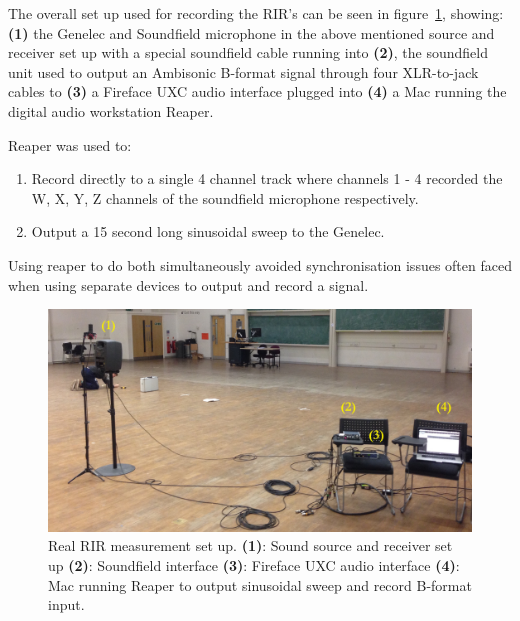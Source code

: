 \documentclass[../../main.tex]{subfiles}
\begin{document}
		The overall set up used for recording the \ac{RIR}'s can be seen in figure~\ref{realRIRSetup}, showing: \textbf{(1)} the Genelec and Soundfield microphone in the above mentioned source and receiver set up with a special soundfield cable running into \textbf{(2)}, the soundfield unit used to output an Ambisonic B-format signal through four XLR-to-jack cables to \textbf{(3)} a Fireface UXC audio interface plugged into \textbf{(4)} a Mac running the digital audio workstation Reaper.

		Reaper was used to:

		\begin{enumerate}
		 \item Record directly to a single 4 channel track where channels 1 - 4 recorded the W, X, Y, Z channels of the soundfield microphone respectively.
		 \item Output a 15 second long sinusoidal sweep to the Genelec.
		 \end{enumerate}

		 Using reaper to do both simultaneously avoided synchronisation issues often faced when using separate devices to output and record a signal.

		\begin{figure}[p]
			\begin{center}
				\includegraphics[width=\textwidth]{Sections/Implementation/RealRIRs/images/realRIRSetup_edit.jpg} 
				\caption{Real \ac{RIR} measurement set up. \textbf{(1)}: Sound source and receiver set up \textbf{(2)}: Soundfield interface \textbf{(3)}: Fireface UXC audio interface \textbf{(4)}: Mac running Reaper to output sinusoidal sweep and record B-format input.}
				\label{realRIRSetup}
			\end{center}
		\end{figure}
\end{document}
